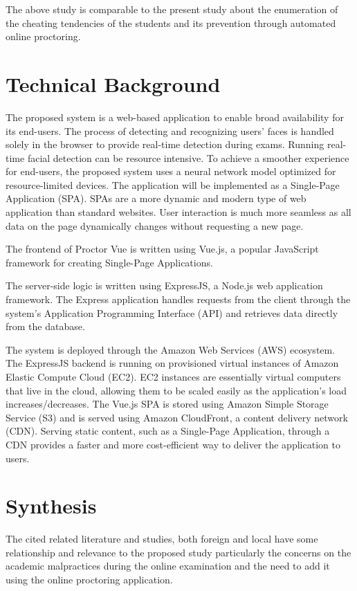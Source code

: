 The above study is comparable to the present study about the enumeration of the cheating tendencies of the students and its prevention through automated online proctoring.

\section{Technical Background}

The proposed system is a web-based application to enable broad availability for its end-users.
The process of detecting and recognizing users’ faces is handled solely in the browser to provide real-time detection during exams.
Running real-time facial detection can be resource intensive.
To achieve a smoother experience for end-users, the proposed system uses a neural network model optimized for resource-limited devices.
The application will be implemented as a Single-Page Application (SPA).
SPAs are a more dynamic and modern type of web application than standard websites.
User interaction is much more seamless as all data on the page dynamically changes without requesting a new page.

The frontend of Proctor Vue is written using Vue.js, a popular JavaScript framework for creating Single-Page Applications.

The server-side logic is written using ExpressJS, a Node.js web application framework.
The Express application handles requests from the client through the system’s Application Programming Interface (API) and retrieves data directly from the database.

The system is deployed through the Amazon Web Services (AWS) ecosystem.
The ExpressJS backend is running on provisioned virtual instances of Amazon Elastic Compute Cloud (EC2).
EC2 instances are essentially virtual computers that live in the cloud, allowing them to be scaled easily as the application’s load increases/decreases.
The Vue.js SPA is stored using Amazon Simple Storage Service (S3) and is served using Amazon CloudFront, a content delivery network (CDN).
Serving static content, such as a Single-Page Application, through a CDN provides a faster and more cost-efficient way to deliver the application to users.


\section{Synthesis}

The cited related literature and studies, both foreign and local have some relationship and relevance to the proposed study particularly the concerns on the academic malpractices during the online examination and the need to add it using the online proctoring application.

